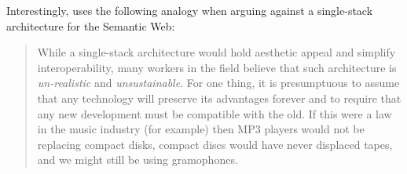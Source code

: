 Interestingly, \citet{Kifer2005} uses the following analogy when arguing against a single-stack architecture for the Semantic Web:

\begin{quotation}
While a single-stack architecture would hold aesthetic appeal and simplify interoperability, many workers in the field believe that such architecture is \textit{un-realistic} and \textit{unsustainable}. For one thing, it is presumptuous to assume that any technology will preserve its advantages forever and to require that any new development must be compatible with the old. If this were a law in the music industry (for example) then MP3 players would not be replacing compact disks, compact discs would have never displaced tapes, and we might still be using gramophones.
\end{quotation}

%


